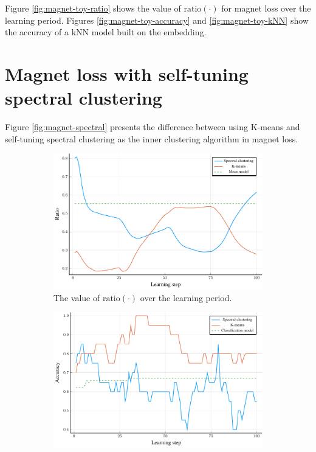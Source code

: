 Figure \ref{fig:magnet-toy-ratio} shows the value of \( \mathrm{ratio} \left( \cdot \right) \) for magnet loss over the learning period. Figures \ref{fig:magnet-toy-accuracy} and \ref{fig:magnet-toy-kNN} show the accuracy of a kNN model built on the embedding.


\section{Magnet loss with self-tuning spectral clustering}

Figure \ref{fig:magnet-spectral} presents the difference between using K-means and self-tuning spectral clustering as the inner clustering algorithm in magnet loss.

\begin{figure}[h]
  \centering
  \begin{subfigure}[b]{0.49\textwidth}
    \centering
    \includegraphics[width=\textwidth]{images/magnet-spectral/ratio/magnet-spectral-ratio.pdf}
    \caption{The value of \( \mathrm{ratio} \left( \cdot \right) \) over the learning period.}
  \end{subfigure}
  \hfill
  \begin{subfigure}[b]{0.49\textwidth}
    \centering
    \includegraphics[width=\textwidth]{images/magnet-spectral/accuracy/magnet-spectral-accuracy.pdf}

\end{subfigure}
\end{figure}
